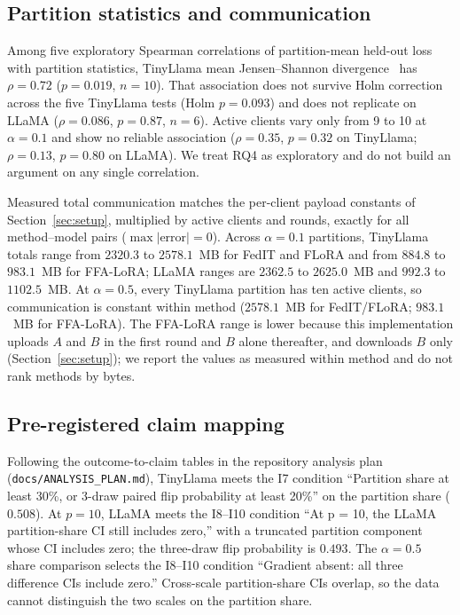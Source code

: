 \begin{table}[!t]
\centering
\caption{Method means and communication ranges by model and setting.}
\label{tab:means}
\small

\end{table}

\subsection{Partition statistics and communication}
Among five exploratory Spearman correlations of partition-mean held-out loss with partition statistics, TinyLlama mean Jensen--Shannon divergence~\cite{lin1991divergence} has $\rho{=}0.72$ ($p{=}0.019$, $n{=}10$). That association does not survive Holm correction across the five TinyLlama tests (Holm $p{=}0.093$) and does not replicate on LLaMA ($\rho{=}0.086$, $p{=}0.87$, $n{=}6$). Active clients vary only from 9 to 10 at $\alpha{=}0.1$ and show no reliable association ($\rho{=}0.35$, $p{=}0.32$ on TinyLlama; $\rho{=}0.13$, $p{=}0.80$ on LLaMA). We treat RQ4 as exploratory and do not build an argument on any single correlation.

Measured total communication matches the per-client payload constants of Section~\ref{sec:setup}, multiplied by active clients and rounds, exactly for all method--model pairs ($\max|\mathrm{error}|{=}0$). Across $\alpha{=}0.1$ partitions, TinyLlama totals range from $2320.3$ to $2578.1$~MB for FedIT and FLoRA and from $884.8$ to $983.1$~MB for FFA-LoRA; LLaMA ranges are $2362.5$ to $2625.0$~MB and $992.3$ to $1102.5$~MB. At $\alpha{=}0.5$, every TinyLlama partition has ten active clients, so communication is constant within method ($2578.1$~MB for FedIT/FLoRA; $983.1$~MB for FFA-LoRA). The FFA-LoRA range is lower because this implementation uploads $A$ and $B$ in the first round and $B$ alone thereafter, and downloads $B$ only (Section~\ref{sec:setup}); we report the values as measured within method and do not rank methods by bytes.

\subsection{Pre-registered claim mapping}
Following the outcome-to-claim tables in the repository analysis plan (\texttt{docs/ANALYSIS\_PLAN.md}), TinyLlama meets the I7 condition ``Partition share at least 30\%, or 3-draw paired flip probability at least 20\%'' on the partition share ($0.508$). At $p{=}10$, LLaMA meets the I8--I10 condition ``At p = 10, the LLaMA partition-share CI still includes zero,'' with a truncated partition component whose CI includes zero; the three-draw flip probability is $0.493$. The $\alpha{=}0.5$ share comparison selects the I8--I10 condition ``Gradient absent: all three difference CIs include zero.'' Cross-scale partition-share CIs overlap, so the data cannot distinguish the two scales on the partition share.
